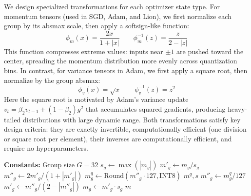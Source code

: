 \documentclass[10pt,twocolumn,letterpaper]{article}
\theoremstyle{plain}
\theoremstyle{definition}
\theoremstyle{remark}
\begin{document}
We design specialized transformations for each optimizer state type.
For momentum tensors (used in SGD, Adam, and Lion), we first normalize each group by its absmax scale, then apply a softsign-like function:
\begin{equation}
    \phi_m(x) = \frac{2x}{1+|x|} \qquad \phi_m^{-1}(z) = \frac{z}{2-|z|}
\end{equation}
This function compresses extreme values: inputs near $\pm 1$ are pushed toward the center, spreading the momentum distribution more evenly across quantization bins.
In contrast, for variance tensors in Adam, we first apply a square root, then normalize by the group absmax:
\begin{equation}
    \phi_v(x) = \sqrt{x} \qquad \phi_v^{-1}(z) = z^2
\end{equation}
Here the square root is motivated by Adam's variance update
$v_t = \beta_2 v_{t-1} + (1 - \beta_2) g^2$ that accumulates squared gradients, producing heavy-tailed distributions with large dynamic range.
Both transformations satisfy key design criteria: they are exactly invertible, computationally efficient (one division or square root per element), their inverses are computationally efficient, and require no hyperparameters.

    \begin{algorithm}[t]
        \caption{$\mathcal{Q}_m$: Momentum Quantization}
        \label{alg:quant_mom}
        \begin{algorithmic}[1]
        \Statex \textbf{Constants:} Group size $G = 32$
        \vspace{0.25\baselineskip}
                \State $s_g \gets \max(|m_g|)$
                \State $m'_g \gets m_g / s_g$
                \State $m''_g \gets 2 m'_g / (1 + |m'_g|)$
                \State $m^q_g \gets \mathrm{Round}(m''_g \cdot 127, \text{INT8})$
            \EndFor
            \State \Return $m^q, s$
        \EndFunction
        \vspace{0.25\baselineskip}
                \State $m''_g \gets m^q_g / 127$
                \State $m'_g \gets m''_g / (2 - |m''_g|)$
                \State $m_g \gets m'_g \cdot s_g$
            \EndFor
            \State \Return $m$
        \EndFunction
        \end{algorithmic}
        \end{algorithm}
\end{document}

